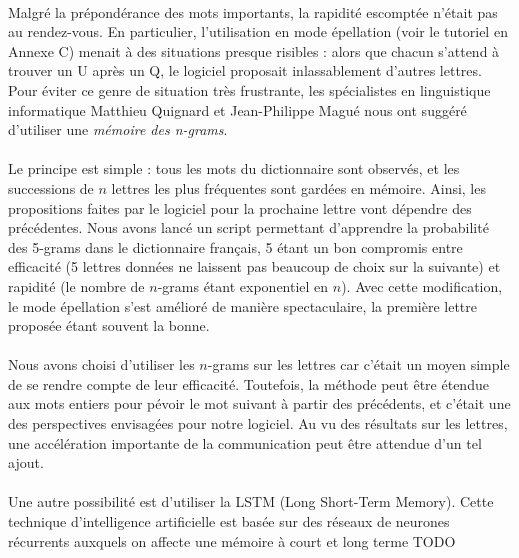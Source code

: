 \documentclass[11pt,a4paper]{article}
\theoremstyle{plain}
\theoremstyle{definition}
\begin{document}
\paragraph{} Malgré la prépondérance des mots importants, la rapidité escomptée n'était pas au rendez-vous. En particulier, l'utilisation en mode épellation (voir le tutoriel en Annexe C) menait à des situations presque risibles : alors que chacun s'attend à trouver un U après un Q, le logiciel proposait inlassablement d'autres lettres. Pour éviter ce genre de situation très frustrante, les spécialistes en linguistique informatique Matthieu Quignard et Jean-Philippe Magué nous ont suggéré d'utiliser une \textit{mémoire des n-grams}.

\paragraph{} Le principe est simple : tous les mots du dictionnaire sont observés, et les successions de $n$ lettres les plus fréquentes sont gardées en mémoire. Ainsi, les propositions faites par le logiciel pour la prochaine lettre vont dépendre des précédentes. Nous avons lancé un script permettant d'apprendre la probabilité des 5-grams dans le dictionnaire français, 5 étant un bon compromis entre efficacité (5 lettres données ne laissent pas beaucoup de choix sur la suivante) et rapidité (le nombre de $n$-grams étant exponentiel en $n$). Avec cette modification, le mode épellation s'est amélioré de manière spectaculaire, la première lettre proposée étant souvent la bonne.

\paragraph{} Nous avons choisi d'utiliser les $n$-grams sur les lettres car c'était un moyen simple de se rendre compte de leur efficacité. Toutefois, la méthode peut être étendue aux mots entiers pour pévoir le mot suivant à partir des précédents, et c'était une des perspectives envisagées pour notre logiciel. Au vu des résultats sur les lettres, une accélération importante de la communication peut être attendue d'un tel ajout.

\paragraph{} Une autre possibilité est d'utiliser la LSTM (Long Short-Term Memory). Cette technique d'intelligence artificielle est basée sur des réseaux de neurones récurrents auxquels on affecte une mémoire à court et long terme %
TODO \\
\end{document}
